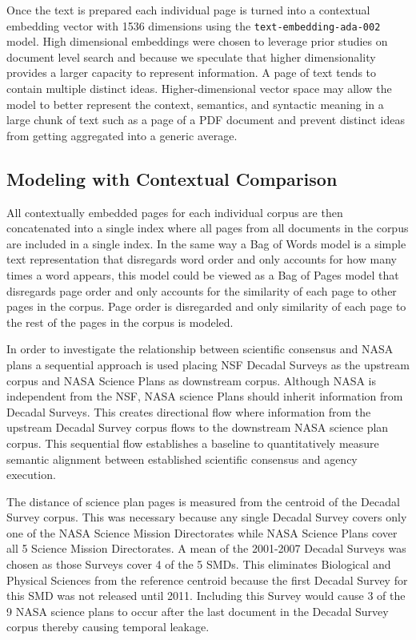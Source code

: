 \documentclass[preprint,12pt,doubleblind]{elsarticle}
\begin{document}
Once the text is prepared each individual page is turned into a contextual embedding vector with 1536 dimensions using the \texttt{text-embedding-ada-002} model. High dimensional embeddings were chosen to leverage prior studies on document level search \cite{Aperdannier2024_embedding_search} and because we speculate that higher dimensionality provides a larger capacity to represent information. A page of text tends to contain multiple distinct ideas.  Higher-dimensional vector space may allow the model to better represent the context, semantics, and syntactic meaning in a large chunk of text such as a page of a PDF document and prevent distinct ideas from getting aggregated into a generic average. 

\subsection{Modeling with Contextual Comparison}
All contextually embedded pages for each individual corpus are then concatenated into a single index where all pages from all documents in the corpus are included in a single index. In the same way a Bag of Words model\cite{harris1954} is a simple text representation that disregards word order and only accounts for how many times a word appears, this model could be viewed as a Bag of Pages model that disregards page order and only accounts for the similarity of each page to other pages in the corpus. Page order is disregarded and only similarity of each page to the rest of the pages in the corpus is modeled. 

In order to investigate the relationship between scientific consensus and NASA plans a sequential approach is used placing NSF Decadal Surveys as the upstream corpus and NASA Science Plans as downstream corpus. Although NASA is independent from the NSF, NASA science Plans should inherit information from Decadal Surveys. This creates directional flow where information from the upstream Decadal Survey corpus flows to the downstream NASA science plan corpus. This sequential flow establishes a baseline to quantitatively measure semantic alignment between established scientific consensus and agency execution.

The distance of science plan pages is measured from the centroid of the Decadal Survey corpus. This was necessary because any single Decadal Survey covers only one of the NASA Science Mission Directorates while NASA Science Plans cover all 5 Science Mission Directorates. A mean of the 2001-2007 Decadal Surveys was chosen as those Surveys cover 4 of the 5 SMDs. This eliminates Biological and Physical Sciences from the reference centroid because the first Decadal Survey for this SMD was not released until 2011. Including this Survey would cause 3 of the 9 NASA science plans to occur after the last document in the Decadal Survey corpus thereby causing temporal leakage. 
\end{document}

